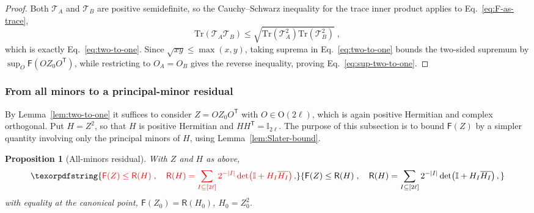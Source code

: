 \documentclass[prx,twocolumn,superscriptaddress,aps,10pt, frontmatterverbose, reprint,footinbib,longbibliography=true]{revtex4-2}
\newtheorem{proposition}{Proposition}
\newcommand{\trans}{\mathsf{T}}
\providecommand{\DIFaddtex}[1]{{\protect\color{red}#1}} %
\providecommand{\DIFaddbegin}{\protect\color{red}} %
\providecommand{\DIFaddend}{\protect\color{black}} %
\providecommand{\DIFaddtex}[1]{\texorpdfstring{\DIFaddtex{#1}}{#1}} %
\providecommand{\DIFadd}[1]{\texorpdfstring{\DIFaddtex{#1}}{#1}} %
\newcommand{\DIFaddincludegraphics}[2][]{{\color{blue}\fbox{\DIFOincludegraphics[#1]{#2}}}} %
\DeclareRobustCommand{\DIFaddbegin}{\DIFOaddbegin \let\includegraphics\DIFaddincludegraphics} %
\DeclareRobustCommand{\DIFaddend}{\DIFOaddend \let\includegraphics\DIFOincludegraphics} %
\begin{document}
\begin{proof}
Both $\mathcal{T}_A$ and $\mathcal{T}_B$ are positive semidefinite, so the Cauchy--Schwarz inequality for the trace inner product applies to Eq.~\eqref{eq:F-as-trace},
\begin{equation}
    \mathrm{Tr}\!\left(\mathcal{T}_A\mathcal{T}_B\right)\le\sqrt{\mathrm{Tr}\!\left(\mathcal{T}_A^2\right)\mathrm{Tr}\!\left(\mathcal{T}_B^2\right)}\;,
\end{equation}
which is exactly Eq.~\eqref{eq:two-to-one}. Since $\sqrt{xy}\le\max(x,y)$, taking suprema in Eq.~\eqref{eq:two-to-one} bounds the two-sided supremum by $\sup_O\mathsf{F}(OZ_0O^{\trans})$, while restricting to $O_A=O_B$ gives the reverse inequality, proving Eq.~\eqref{eq:sup-two-to-one}.
\end{proof}


\subsubsection{From all minors to a principal-minor residual}
\label{app:proof:residual}

By Lemma~\ref{lem:two-to-one} it suffices to consider $Z=OZ_0O^{\trans}$ with $O\in\mathrm{O}(2\ell)$,  which is again positive Hermitian and complex orthogonal. Put $H=Z^2$, so that $H$ is positive Hermitian and $HH^{\trans}=\mathbb{I}_{2\ell}$.
The purpose of this subsection is to bound $\mathsf{F}(Z)$ by a simpler quantity involving only the principal minors of $H$, using Lemma~\ref{lem:Slater-bound}.
\begin{proposition}[All-minors residual]
\label{prop:residual}
With $Z$ and $H$ as above,
\DIFaddbegin \begin{equation}
    \DIFadd{\mathsf{F}(Z)\le \mathsf{R}(H)\;,\quad \mathsf{R}(H)=\sum_{I\subseteq[2\ell]}2^{-|I|}\det\!\left(\mathbb{I}+H_I\overline{H_I}\right),
    \label{eq:R-definition}
}\end{equation}\DIFaddend 
with equality at the canonical point, $\mathsf{F}(Z_0)=\mathsf{R}(H_0)$, $H_0=Z_0^2$.
\end{proposition}
\end{document}

